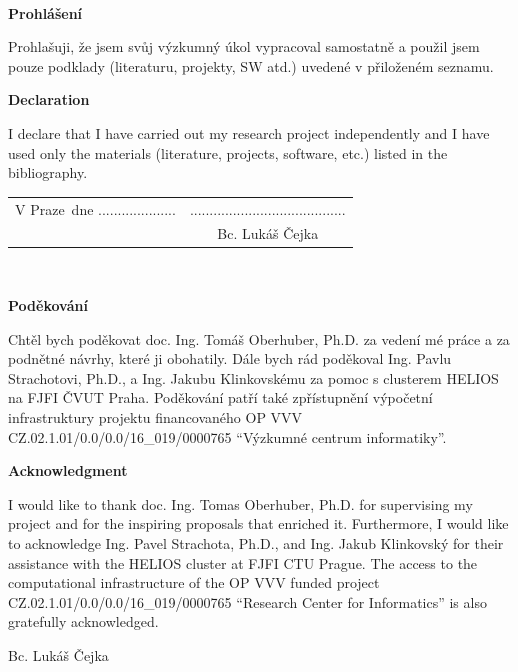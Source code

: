 \documentclass[11pt,twoside,czech,american]{book}
\newcommand{\tb}{\textbf} 								  									   %
\newcommand{\paperAuthor}{Bc. Lukáš Čejka}   				 %
\newcommand{\place}{Praze} 									 %
\newcommand{\declarationCZ}{Prohlašuji, že jsem svůj výzkumný úkol vypracoval samostatně a použil jsem pouze podklady (literaturu, projekty, SW atd.) uvedené v přiloženém seznamu.}
\newcommand{\declarationEN}{I declare that I have carried out my research project independently and I have used only the materials (literature, projects, software, etc.) listed in the bibliography.}
\newcommand{\acknowledgementCZ}{Chtěl bych poděkovat doc. Ing. Tomáš Oberhuber, Ph.D. za vedení mé práce a za podnětné návrhy, které ji obohatily. Dále bych rád poděkoval Ing. Pavlu Strachotovi, Ph.D., a Ing. Jakubu Klinkovskému za pomoc s clusterem HELIOS na FJFI ČVUT Praha. Poděkování patří také zpřístupnění výpočetní infrastruktury projektu financovaného OP VVV CZ.02.1.01/0.0/0.0/16\_019/0000765 ``Výzkumné centrum informatiky''.}
\newcommand{\acknowledgementEN}{I would like to thank doc. Ing. Tomas Oberhuber, Ph.D. for supervising my project and for the inspiring proposals that enriched it. Furthermore, I would like to acknowledge Ing. Pavel Strachota, Ph.D., and Ing. Jakub Klinkovský for their assistance with the HELIOS cluster at FJFI CTU Prague. The access to the computational infrastructure of the OP VVV funded project CZ.02.1.01/0.0/0.0/16\_019/0000765 ``Research Center for Informatics'' is also gratefully acknowledged.}
\begin{document}
\newpage 			  %
\thispagestyle{empty} %

~ 					  %
\vfill 				  %

\tb{Prohlášení} 	  %

\vspace{1em} 		  %
\declarationCZ

%
\vspace{1em}
\tb{Declaration}

\vspace{1em}
\declarationEN
{}%

\vspace{2em}  									 							    %
\hspace{-0.5em}\begin{tabularx}{\textwidth}{X c} 							    %
V \place\ dne .................... &........................................ \\ %
	& \paperAuthor
\end{tabularx} %




\newpage
\thispagestyle{empty}

~
\vfill %

\tb{Poděkování}

\vspace{1em} 				%
\acknowledgementCZ

%
\vspace{1em}
\tb{Acknowledgment}

%
\vspace{1em} 				%
\acknowledgementEN
\begin{flushright}
\paperAuthor
\end{flushright}  			%




\newpage   			  %
\thispagestyle{empty} %

\newbox\odstavecbox
\newlength\vyskaodstavce
\newcommand\odstavec[2]{%
    \setbox\odstavecbox=\hbox{%
         \parbox[t]{#1}{#2\vrule width 0pt depth 4pt}}%
    \global\vyskaodstavce=\dp\odstavecbox
    \box\odstavecbox}
\newcommand{\delka}{120mm} %
\end{document}
